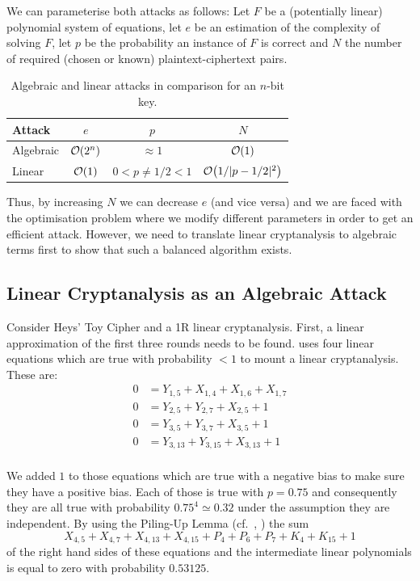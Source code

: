 We can parameterise both attacks as follows: Let $F$ be a (potentially linear) polynomial system of equations, let $e$ be an estimation of the complexity of solving $F$, let $p$ be the probability an instance of $F$ is correct and $N$ the number of required (chosen or known) plaintext-ciphertext pairs. 

\begin{table}[htbp]
\begin{center}
\begin{tabular}{|l|c|c|c|}
\hline
Attack & $e$ & $p$ & $N$\\
\hline
Algebraic & $\mathcal{O}\!\left(2^n\right)$ & $\approx 1$ & $\mathcal{O}\!\left(1\right)$\\
Linear & $\mathcal{O}\!\left(1\right)$ & $0 < p\neq 1/2 < 1$ & $\mathcal{O}\!\left(1/|p -1/2|^2\right)$\\
\hline
\end{tabular}
\end{center}
\caption{Algebraic and linear attacks in comparison for an $n$-bit key.}
\label{tab:linalg-comp}
\end{table}

Thus, by increasing $N$ we can decrease $e$ (and vice versa) and we are faced with the optimisation problem where we modify different parameters in order to get an efficient attack. However, we need to translate linear cryptanalysis to algebraic terms first to show that such a balanced algorithm exists.

\subsection{Linear Cryptanalysis as an Algebraic Attack}
Consider Heys' Toy Cipher and a 1R linear cryptanalysis. First, a linear approximation of the first three rounds needs to
be found. \cite{Heys2002} uses four linear equations which are true with probability $<1$ to mount a linear cryptanalysis. These are:
\begin{align*}
0 &= Y_{1, 5} + X_{1, 4} + X_{1, 6} + X_{1,7}\\
0 &= Y_{2, 5} + Y_{2, 7} + X_{2, 5} + 1 \\
0 &= Y_{3, 5} + Y_{3, 7} + X_{3, 5} + 1 \\
0 &= Y_{3,13} + Y_{3,15} + X_{3,13} + 1 \\ 
\end{align*}

We added $1$ to those equations which are true with a negative bias to make sure they have a positive bias.
Each of those is true with $p=0.75$ and consequently they are all true with probability $0.75^{4} \simeq  0.32$ under the assumption they are independent. By using the Piling-Up Lemma (cf.~\cite{Matsui1993}, \cite{Heys2002}) the
sum 
\[
X_{4,5} + X_{4,7} + X_{4,13} + X_{4,15} +  P_{4} + P_{6} + P_{7} + K_{4} + K_{15} + 1
\]
of the right hand sides of these equations and the intermediate linear polynomials is equal to zero with probability
$0.53125$.

